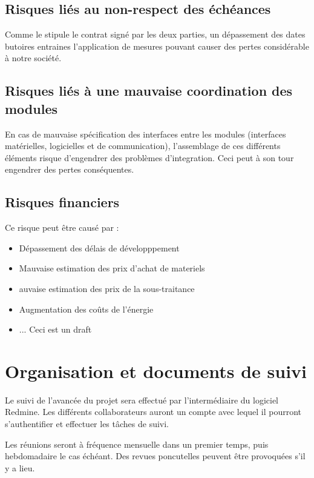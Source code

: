 \subsection{Risques liés au non-respect des échéances}
Comme le stipule le contrat signé par les deux parties, un dépassement des dates butoires entraines l'application de mesures pouvant
causer des pertes considérable à notre société.

\subsection{Risques liés à une mauvaise coordination des modules}
En cas de mauvaise spécification des interfaces entre les modules (interfaces
matérielles, logicielles et de communication), l’assemblage de ces différents éléments risque d'engendrer des problèmes d'integration.
Ceci peut à son tour engendrer des pertes conséquentes.

\subsection{Risques financiers}
Ce risque peut être causé par :
\begin{itemize}
\item Dépassement des délais de développpement
\item Mauvaise estimation des prix d'achat de materiels
\item auvaise estimation des prix de la sous-traitance
\item Augmentation des coûts de l’énergie
\item ... Ceci est un draft
\end{itemize}

\section{Organisation et documents de suivi}

Le suivi de l’avancée du projet sera effectué par l’intermédiaire du logiciel Redmine. Les différents collaborateurs auront un compte
avec lequel il pourront s'authentifier et effectuer les tâches de suivi.

Les réunions seront à fréquence mensuelle dans un premier temps, puis hebdomadaire le cas échéant. Des revues poncutelles peuvent être provoquées
s'il y a lieu.



